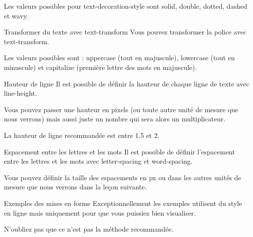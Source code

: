\documentclass[a4paper]{article}
\begin{document}
Les valeurs possibles pour text-decoration-style sont solid, double, dotted, dashed et wavy.

Transformer du texte avec text-transform
Vous pouvez transformer la police avec text-transform.

Les valeurs possibles sont : uppercase (tout en majuscule), lowercase (tout en minuscule) et capitalize (première lettre des mots en majuscule).

Hauteur de ligne
Il est possible de définir la hauteur de chaque ligne de texte avec line-height.

Vous pouvez passer une hauteur en pixels (ou toute autre unité de mesure que nous verrons) mais aussi juste un nombre qui sera alors un multiplicateur.

La hauteur de ligne recommandée est entre 1.5 et 2.

Espacement entre les lettres et les mots
Il est possible de définir l'espacement entre les lettres et les mots avec letter-spacing et word-spacing.

Vous pouvez définir la taille des espacements en px ou dans les autres unités de mesure que nous verrons dans la leçon suivante.

Exemples des mises en forme
Exceptionnellement les exemples utilisent du style en ligne mais uniquement pour que vous puissiez bien visualiser.

N'oubliez pas que ce n'est pas la méthode recommandée.
\end{document}
